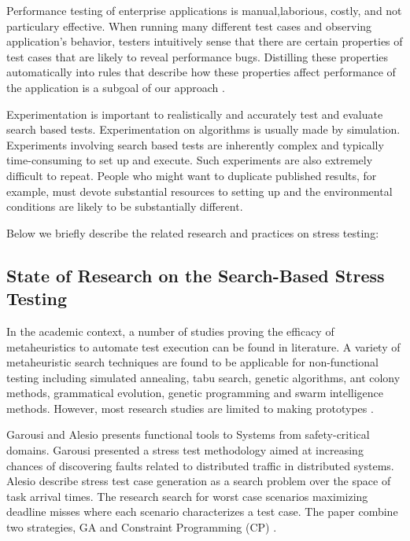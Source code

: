 \documentclass{report}
\begin{document}
Performance testing of enterprise applications is manual,laborious, costly, and not particulary effective. When running many different test cases and observing application’s behavior, testers intuitively sense that there are certain properties of test cases that are likely to reveal performance bugs. Distilling these properties automatically into rules that describe how these properties affect performance of the application is a subgoal of our approach \cite{Grechanik2012}.

Experimentation is important to realistically and accurately test and evaluate search based tests. Experimentation on algorithms is usually made by simulation. Experiments involving search based tests are inherently complex and typically time-consuming to set up and execute. Such experiments are also extremely difficult to repeat. People who might want to duplicate published results, for example, must devote substantial resources to setting up and the environmental conditions are likely to be substantially different.

Below we briefly describe the related research and practices on stress testing:



\subsection{State of Research on the Search-Based Stress  Testing}

In the academic context, a number of studies proving the efficacy of metaheuristics to automate test execution can be found in literature. A variety of metaheuristic search techniques are found to be applicable for non-functional testing including simulated annealing, tabu search, genetic algorithms, ant colony methods, grammatical evolution, genetic programming and swarm intelligence methods. However, most research studies are limited to making prototypes \cite{Afzal2009a}.  

Garousi and Alesio presents functional tools to Systems from safety-critical domains. Garousi presented a stress test methodology aimed at increasing chances of discovering faults related to distributed traffic in distributed systems. Alesio describe stress test case generation as a search problem over the space of task arrival times. The research search for worst case scenarios maximizing deadline misses where each scenario characterizes a test case. The paper combine two strategies, GA and Constraint Programming (CP) \cite{Garousi2006} \cite{Garousi2010} \cite{DiAlesio2013} \cite{DiAlesio2014} \cite{Alesio2015}. 
\end{document}
